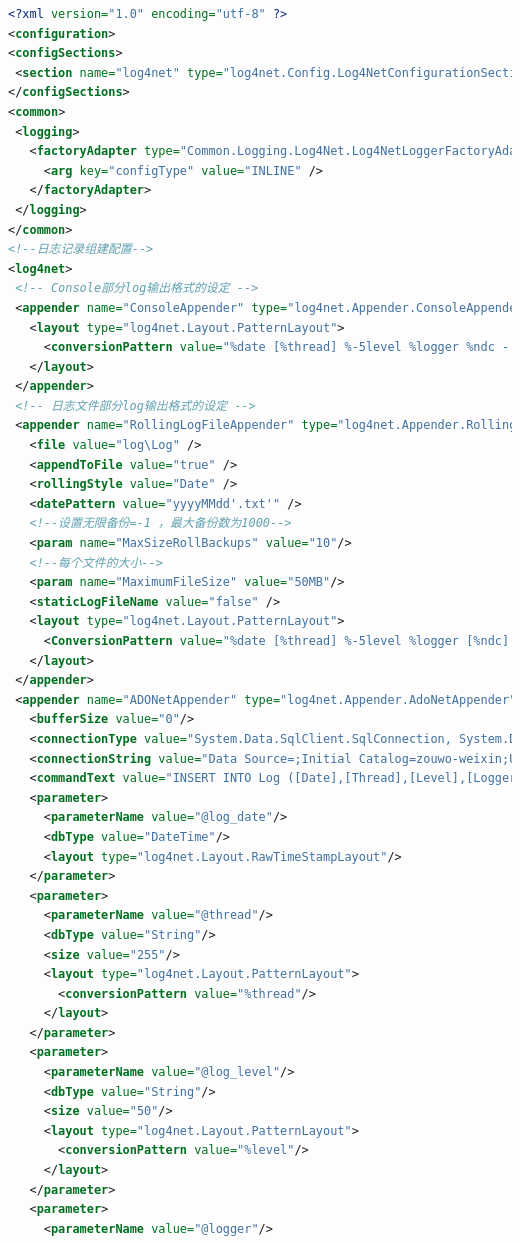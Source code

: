 \documentclass{book}
\begin{document}
\begin{lstlisting}[language=XML]
<?xml version="1.0" encoding="utf-8" ?>
<configuration>
<configSections> 
 <section name="log4net" type="log4net.Config.Log4NetConfigurationSectionHandler, log4net" />
</configSections>
<common>
 <logging>
   <factoryAdapter type="Common.Logging.Log4Net.Log4NetLoggerFactoryAdapter, Common.Logging.Log4net">
     <arg key="configType" value="INLINE" />
   </factoryAdapter>
 </logging>
</common>
<!--日志记录组建配置-->
<log4net>
 <!-- Console部分log输出格式的设定 -->
 <appender name="ConsoleAppender" type="log4net.Appender.ConsoleAppender">
   <layout type="log4net.Layout.PatternLayout">
     <conversionPattern value="%date [%thread] %-5level %logger %ndc - %message%newline" />
   </layout>
 </appender>
 <!-- 日志文件部分log输出格式的设定 -->
 <appender name="RollingLogFileAppender" type="log4net.Appender.RollingFileAppender">
   <file value="log\Log" />
   <appendToFile value="true" />
   <rollingStyle value="Date" />
   <datePattern value="yyyyMMdd'.txt'" />
   <!--设置无限备份=-1 ，最大备份数为1000-->
   <param name="MaxSizeRollBackups" value="10"/>
   <!--每个文件的大小-->
   <param name="MaximumFileSize" value="50MB"/>   
   <staticLogFileName value="false" />
   <layout type="log4net.Layout.PatternLayout">        
     <ConversionPattern value="%date [%thread] %-5level %logger [%ndc] - %message%newline" />
   </layout>
 </appender>
 <appender name="ADONetAppender" type="log4net.Appender.AdoNetAppender">
   <bufferSize value="0"/>
   <connectionType value="System.Data.SqlClient.SqlConnection, System.Data, Version=1.0.3300.0, Culture=neutral, PublicKeyToken=b77a5c561934e089"/>
   <connectionString value="Data Source=;Initial Catalog=zouwo-weixin;User ID=;Password="/>
   <commandText value="INSERT INTO Log ([Date],[Thread],[Level],[Logger],[Message],[Exception]) VALUES (@log_date, @thread, @log_level, @logger, @message, @exception)"/>
   <parameter>
     <parameterName value="@log_date"/>
     <dbType value="DateTime"/>
     <layout type="log4net.Layout.RawTimeStampLayout"/>
   </parameter>
   <parameter>
     <parameterName value="@thread"/>
     <dbType value="String"/>
     <size value="255"/>
     <layout type="log4net.Layout.PatternLayout">
       <conversionPattern value="%thread"/>
     </layout>
   </parameter>
   <parameter>
     <parameterName value="@log_level"/>
     <dbType value="String"/>
     <size value="50"/>
     <layout type="log4net.Layout.PatternLayout">
       <conversionPattern value="%level"/>
     </layout>
   </parameter>
   <parameter>
     <parameterName value="@logger"/>

\end{lstlisting}
\end{document}

